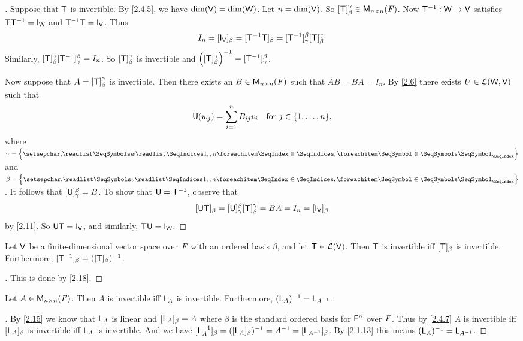 \begin{proof}[]
	Suppose that \(\mathsf{T}\) is invertible.
	By \cref{2.4.5}, we have \(\dim(\mathsf{V}) = \dim(\mathsf{W})\).
	Let \(n = \dim(\mathsf{V})\).
	So \([\T]_{\beta}^{\gamma} \in \ms[n][n][\F]\).
	Now \(\mathsf{T}^{-1} : \mathsf{W} \to \mathsf{V}\) satisfies \(\T \T^{-1} = \IT[\W]\) and \(\T^{-1} \T = \IT[\V]\).
	Thus
	\[
		I_n = [\IT[\V]]_{\beta} = [\T^{-1} \T]_{\beta} = [\T^{-1}]_{\gamma}^{\beta} [\T]_{\beta}^{\gamma}.
	\]
	Similarly, \([\mathsf{T}]_{\beta}^{\gamma} [\mathsf{T}^{-1}]_{\gamma}^{\beta} = I_n\).
	So \([\mathsf{T}]_{\beta}^{\gamma}\) is invertible and \(\left\lparen[\mathsf{T}]_{\beta}^{\gamma}\right\rparen^{-1} = [\mathsf{T}^{-1}]_{\gamma}^{\beta}\).

	Now suppose that \(A = [\mathsf{T}]_{\beta}^{\gamma}\) is invertible.
	Then there exists an \(B \in \ms[n][n][\F]\) such that \(AB = BA = I_n\).
	By \cref{2.6} there exists \(U \in \mathcal{L}(\mathsf{W}, \mathsf{V})\) such that
	\[
		\U(w_j) = \sum_{i = 1}^n B_{i j} v_i \quad \text{for } j \in \set{1, \dots, n},
	\]
	where \(\gamma = \set{\seq{w}{1,,n}}\) and \(\beta = \set{\seq{v}{1,,n}}\).
	It follows that \([\mathsf{U}]_{\gamma}^{\beta} = B\).
	To show that \(\mathsf{U} = \mathsf{T}^{-1}\), observe that
	\[
		[\U \T]_{\beta} = [\U]_{\gamma}^{\beta} [\T]_{\beta}^{\gamma} = BA = I_n = [\IT[\V]]_{\beta}
	\]
	by \cref{2.11}.
	So \(\U \T = \IT[\V]\), and similarly, \(\T \U = \IT[\W]\).
\end{proof}

\begin{cor}\label{2.4.6}
	Let \(\mathsf{V}\) be a finite-dimensional vector space over \(\mathit{F}\) with an ordered basis \(\beta\), and let \(\mathsf{T} \in \mathcal{L}(\mathsf{V})\).
	Then \(\mathsf{T}\) is invertible iff \([\mathsf{T}]_{\beta}\) is invertible.
	Furthermore, \([\mathsf{T}^{-1}]_{\beta} = ([\mathsf{T}]_{\beta})^{-1}\).
\end{cor}

\begin{proof}[]
	This is done by \cref{2.18}.
\end{proof}

\begin{cor}\label{2.4.7}
	Let \(A \in \ms[n][n][\F]\).
	Then \(A\) is invertible iff \(\mathsf{L}_A\) is invertible.
	Furthermore, \((\mathsf{L}_A)^{-1} = \mathsf{L}_{A^{-1}}\).
\end{cor}

\begin{proof}[]
	By \cref{2.15} we know that \(\mathsf{L}_A\) is linear and \([\mathsf{L}_A]_{\beta} = A\) where \(\beta\) is the standard ordered basis for \(\mathsf{F}^n\) over \(\mathit{F}\).
	Thus by \cref{2.4.7} \(A\) is invertible iff \([\mathsf{L}_A]_{\beta}\) is invertible iff \(\mathsf{L}_A\) is invertible.
	And we have \([\mathsf{L}_A^{-1}]_{\beta} = ([\mathsf{L}_A]_{\beta})^{-1} = A^{-1} = [\mathsf{L}_{A^{-1}}]_{\beta}\).
	By \cref{2.1.13} this means \((\mathsf{L}_A)^{-1} = \mathsf{L}_{A^{-1}}\).
\end{proof}

